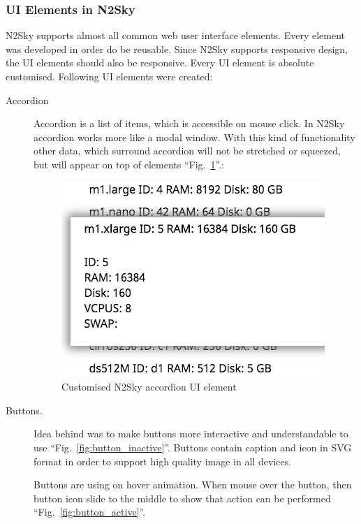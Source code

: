 \subsubsection{UI Elements in N2Sky}\label{UI Elements in N2Sky}

N2Sky supports almost all common web user interface elements. Every element was developed in order do be reusable. Since N2Sky supports responsive design, the UI elements should also be responsive. Every UI element is absolute customised. Following UI elements were created:

\begin{description}
\item[Accordion]  Accordion is a list of items, which is accessible on mouse click. In N2Sky accordion works more like a modal window. With this kind of functionality other data, which surround accordion will not be stretched or squeezed, but will appear on top of elements ``Fig.~\ref{fig:accordion}''.: 

\begin{figure}[htbp]
\begin{center}
  \includegraphics[scale=0.75]{components/3/components/accordion.png}
  \caption{Customised N2Sky accordion UI element}
  \label{fig:accordion}
\end{center}
\end{figure}

\item[Buttons.] Idea behind was to make buttons more interactive and understandable to use ``Fig.~\ref{fig:button_inactive}''. Buttons contain caption and icon in SVG format in order to support high quality image in all devices.

Buttons are using on hover animation. When mouse over the button, then button icon slide to the middle to show that action can be performed ``Fig.~\ref{fig:button_active}''. 


\end{description}
